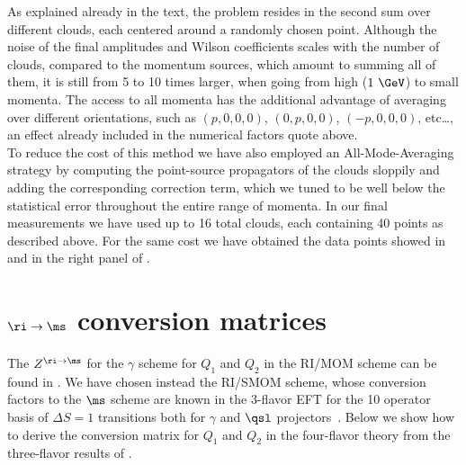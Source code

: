 \documentclass[aps,prd,twocolumn,nofootinbib,showpacs,superscriptaddress]{revtex4-1}
\begin{document}
As explained already in the text, the problem resides in the second sum 
over different clouds, each centered around a randomly chosen point. 
Although the noise of the final amplitudes and Wilson coefficients
scales with the number of clouds, compared to the momentum sources, 
which amount to summing all of them,
it is still from 5 to 10 times larger, when going from high ($1~\GeV$) to 
small momenta.
The access to all momenta has the additional advantage of averaging
over different orientations, such as $(p,0,0,0)$, $(0,p,0,0)$, $(-p,0,0,0)$, 
etc\dots, an effect already included in the numerical factors quote above.\\ 

To reduce the cost of this method we have also employed an All-Mode-Averaging~\cite{Blum:2012uh}
strategy by computing the point-source propagators of the clouds 
sloppily and adding the corresponding correction term, 
which we tuned to be well below the statistical error
throughout the entire range of momenta. In our final measurements
we have used up to 16 total clouds, each containing 40 points as described above.
For the same cost we have obtained the data points showed in 
and in the right panel of .

\section{$\ri \to \ms$ conversion matrices}
\label{app:rims}
The $Z^{\ri \to \ms}$ for the $\gamma$ scheme for $Q_1$ and $Q_2$ in
the RI/MOM scheme can be found in . 
We have chosen instead the RI/SMOM scheme, whose conversion factors to the $\ms$ scheme
are known in the 3-flavor EFT for the 10 operator 
basis of $\Delta S=1$ transitions
both for $\gamma$ and $\qsl$ projectors~\cite{Lehner:2011fz}.
Below we show how to derive the conversion matrix for $Q_1$ and $Q_2$ 
in the four-flavor theory from the three-flavor results of .
\end{document}

